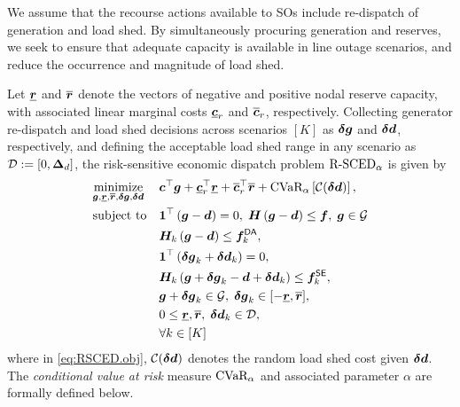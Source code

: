 %
We assume that the recourse actions available to SOs include re-dispatch of generation and load shed. By simultaneously procuring generation and reserves, we seek to ensure that adequate capacity is available in line outage scenarios, and reduce the occurrence and magnitude of load shed. 

Let $\underline{{\bm{r}}}$ and $\overline{{\bm{r}}}$ denote the vectors of negative and positive nodal reserve capacity, with associated linear marginal costs $\underline{{\bm{c}}}_r$ and $\overline{{\bm{c}}}_r$, respectively. Collecting generator re-dispatch
and load shed decisions across scenarios $[K]$ as ${\bm{\delta g}}$ and ${\bm{\delta d}}$, respectively, and 
defining the acceptable load shed range in any scenario as $\mathcal{D} := [0, {\bm{\Delta}}_d]$, the risk-sensitive economic dispatch problem $\text{R-SCED}{}_{\alpha}$ is given by
%
\begin{subequations} %
\label{eq:RSCED} %
\begin{align} %
    &\underset{\v{g}, \underline{\v{r}}, \overline{\v{r}}, \v{\delta g}, \v{\delta d}}{\text{minimize}} && \v{c}^\top \v{g} + \underline{\v{c}}_r^\top \underline{\v{r}} + \overline{\v{c}}_r^\top \overline{\v{r}} + \CVaR{}_{\alpha} \left[ \mathcal{C}(\v{\delta d} ) \right] \label{eq:RSCED.obj}, \\
    &\text{subject to} && \bone^\top \left(\v{g} - \v{d}\right) = 0, \; \v{H} \left( \v{g} - \v{d} \right) \le \v{f}, \; \v{g} \in \Gcal \label{eq:RSCED.nominal} \\
    &&& \v{H}_k \left( \v{g} - \v{d} \right) \le \v{f}_k^{\DA},\label{eq:RSCED.da} \\
    &&& \bone^\top \left( \v{\delta g}_k + \v{\delta d}_k \right) = 0,\label{eq:RSCED.se.balance} \\
    &&& \v{H}_k \left( \v{g} + \v{\delta g}_k - \v{d} + \v{\delta d}_k \right) \le \v{f}_k^{\SE}, \label{eq:RSCED.se.flow} \\
    &&& \v{g} + \v{\delta g}_k \in \Gcal, \; \v{\delta g}_k \in [-\underline{\v{r}}, \overline{\v{r}}], \label{eq:RSCED.se.genbounds} \\
    &&& 0 \le \underline{\v{r}}, \overline{\v{r}}, \; \v{\delta d}_k \in \mathcal{D}, \label{eq:RSCED.se.bounds} \\
    \nonumber &&& \forall k\in [K]
\end{align} %
\end{subequations} %
%
where in \eqref{eq:RSCED.obj}, ${\cal C}({\bm{\delta d}})$ denotes the random load shed cost given ${\bm{\delta d}}$. The \emph{conditional value at risk} measure ${\textrm{CVaR}}{}_{\alpha}$ and associated parameter $\alpha$ are formally defined below. 

